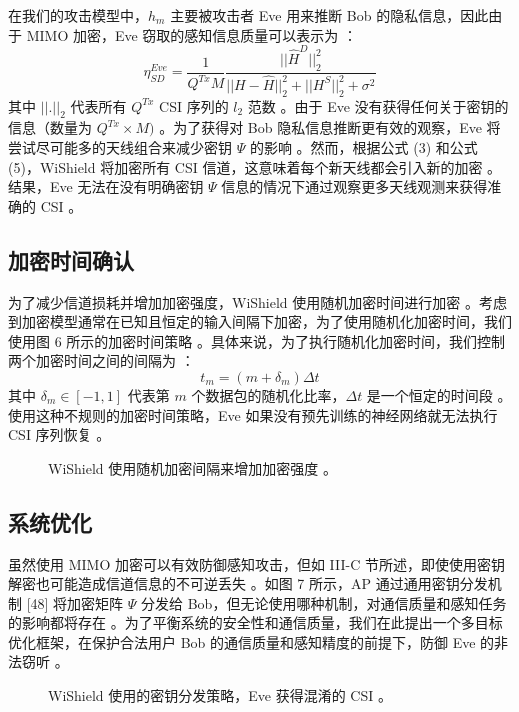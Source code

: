 \documentclass[journal]{IEEEtran}
\begin{document}
在我们的攻击模型中，$h_{m}$ 主要被攻击者 Eve 用来推断 Bob 的隐私信息，因此由于 MIMO 加密，Eve 窃取的感知信息质量可以表示为 ：
\begin{equation}
\eta_{SD}^{Eve}=\frac{1}{Q^{Tx}M}\frac{||\hat{H}^{D}||_{2}^{2}}{||H-\hat{H}||_{2}^{2}+||H^{S}||_{2}^{2}+\sigma^{2}}
\end{equation}
其中 $||.||_{2}$ 代表所有 $Q^{Tx}$ CSI 序列的 $l_{2}$ 范数 。由于 Eve 没有获得任何关于密钥的信息（数量为 $Q^{Tx}\times M)$ 。为了获得对 Bob 隐私信息推断更有效的观察，Eve 将尝试尽可能多的天线组合来减少密钥 $\Psi$ 的影响 。然而，根据公式 (3) 和公式 (5)，WiShield 将加密所有 CSI 信道，这意味着每个新天线都会引入新的加密 。结果，Eve 无法在没有明确密钥 $\Psi$ 信息的情况下通过观察更多天线观测来获得准确的 CSI 。

\subsection{加密时间确认}
为了减少信道损耗并增加加密强度，WiShield 使用随机加密时间进行加密 。考虑到加密模型通常在已知且恒定的输入间隔下加密，为了使用随机化加密时间，我们使用图 6 所示的加密时间策略 。具体来说，为了执行随机化加密时间，我们控制两个加密时间之间的间隔为 ：
\begin{equation}
t_{m}=(m+\delta_{m})\Delta t
\end{equation}
其中 $\delta_{m}\in[-1,1]$ 代表第 $m$ 个数据包的随机化比率，$\Delta t$ 是一个恒定的时间段 。使用这种不规则的加密时间策略，Eve 如果没有预先训练的神经网络就无法执行 CSI 序列恢复 。

\begin{figure}[htbp]
\centering
\caption{WiShield 使用随机加密间隔来增加加密强度 。}
\label{fig:intervals}
\end{figure}

\subsection{系统优化}
虽然使用 MIMO 加密可以有效防御感知攻击，但如 III-C 节所述，即使使用密钥解密也可能造成信道信息的不可逆丢失 。如图 7 所示，AP 通过通用密钥分发机制 [48] 将加密矩阵 $\Psi$ 分发给 Bob，但无论使用哪种机制，对通信质量和感知任务的影响都将存在 。为了平衡系统的安全性和通信质量，我们在此提出一个多目标优化框架，在保护合法用户 Bob 的通信质量和感知精度的前提下，防御 Eve 的非法窃听 。

\begin{figure}[htbp]
\centering
\caption{WiShield 使用的密钥分发策略，Eve 获得混淆的 CSI 。}
\label{fig:key_distribution}
\end{figure}
\end{document}
